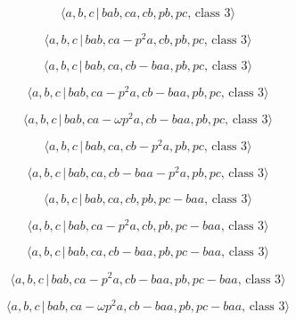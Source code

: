 \documentclass[10pt]{article}
\begin{document}
\begin{equation}
\langle a,b,c\,|\,bab,ca,cb,pb,pc,\,\text{class }3\rangle  \tag{7.1022}
\end{equation}

\begin{equation}
\langle a,b,c\,|\,bab,ca-p^2a,cb,pb,pc,\,\text{class }3\rangle  \tag{7.1023}
\end{equation}

\begin{equation}
\langle a,b,c\,|\,bab,ca,cb-baa,pb,pc,\,\text{class }3\rangle  \tag{7.1024}
\end{equation}

\begin{equation}
\langle a,b,c\,|\,bab,ca-p^2a,cb-baa,pb,pc,\,\text{class }3\rangle 
\tag{7.1025}
\end{equation}

\begin{equation}
\langle a,b,c\,|\,bab,ca-\omega p^{2}a,cb-baa,pb,pc,\,\text{class }3\rangle 
\tag{7.1026}
\end{equation}

\begin{equation}
\langle a,b,c\,|\,bab,ca,cb-p^2a,pb,pc,\,\text{class }3\rangle  \tag{7.1027}
\end{equation}

\begin{equation}
\langle a,b,c\,|\,bab,ca,cb-baa-p^2a,pb,pc,\,\text{class }3\rangle 
\tag{7.1028}
\end{equation}

\begin{equation}
\langle a,b,c\,|\,bab,ca,cb,pb,pc-baa,\,\text{class }3\rangle  \tag{7.1029}
\end{equation}

\begin{equation}
\langle a,b,c\,|\,bab,ca-p^2a,cb,pb,pc-baa,\,\text{class }3\rangle 
\tag{7.1030}
\end{equation}

\begin{equation}
\langle a,b,c\,|\,bab,ca,cb-baa,pb,pc-baa,\,\text{class }3\rangle 
\tag{7.1031}
\end{equation}

\begin{equation}
\langle a,b,c\,|\,bab,ca-p^2a,cb-baa,pb,pc-baa,\,\text{class }3\rangle 
\tag{7.1032}
\end{equation}

\begin{equation}
\langle a,b,c\,|\,bab,ca-\omega p^{2}a,cb-baa,pb,pc-baa,\,\text{class }%
3\rangle  \tag{7.1033}
\end{equation}
\end{document}
